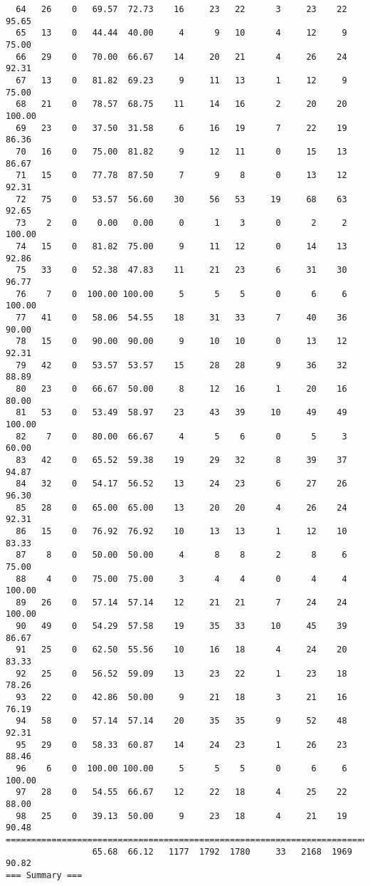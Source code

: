 \begin{verbatim}
  64   26    0   69.57  72.73    16     23   22      3     23    22    95.65
  65   13    0   44.44  40.00     4      9   10      4     12     9    75.00
  66   29    0   70.00  66.67    14     20   21      4     26    24    92.31
  67   13    0   81.82  69.23     9     11   13      1     12     9    75.00
  68   21    0   78.57  68.75    11     14   16      2     20    20   100.00
  69   23    0   37.50  31.58     6     16   19      7     22    19    86.36
  70   16    0   75.00  81.82     9     12   11      0     15    13    86.67
  71   15    0   77.78  87.50     7      9    8      0     13    12    92.31
  72   75    0   53.57  56.60    30     56   53     19     68    63    92.65
  73    2    0    0.00   0.00     0      1    3      0      2     2   100.00
  74   15    0   81.82  75.00     9     11   12      0     14    13    92.86
  75   33    0   52.38  47.83    11     21   23      6     31    30    96.77
  76    7    0  100.00 100.00     5      5    5      0      6     6   100.00
  77   41    0   58.06  54.55    18     31   33      7     40    36    90.00
  78   15    0   90.00  90.00     9     10   10      0     13    12    92.31
  79   42    0   53.57  53.57    15     28   28      9     36    32    88.89
  80   23    0   66.67  50.00     8     12   16      1     20    16    80.00
  81   53    0   53.49  58.97    23     43   39     10     49    49   100.00
  82    7    0   80.00  66.67     4      5    6      0      5     3    60.00
  83   42    0   65.52  59.38    19     29   32      8     39    37    94.87
  84   32    0   54.17  56.52    13     24   23      6     27    26    96.30
  85   28    0   65.00  65.00    13     20   20      4     26    24    92.31
  86   15    0   76.92  76.92    10     13   13      1     12    10    83.33
  87    8    0   50.00  50.00     4      8    8      2      8     6    75.00
  88    4    0   75.00  75.00     3      4    4      0      4     4   100.00
  89   26    0   57.14  57.14    12     21   21      7     24    24   100.00
  90   49    0   54.29  57.58    19     35   33     10     45    39    86.67
  91   25    0   62.50  55.56    10     16   18      4     24    20    83.33
  92   25    0   56.52  59.09    13     23   22      1     23    18    78.26
  93   22    0   42.86  50.00     9     21   18      3     21    16    76.19
  94   58    0   57.14  57.14    20     35   35      9     52    48    92.31
  95   29    0   58.33  60.87    14     24   23      1     26    23    88.46
  96    6    0  100.00 100.00     5      5    5      0      6     6   100.00
  97   28    0   54.55  66.67    12     22   18      4     25    22    88.00
  98   25    0   39.13  50.00     9     23   18      4     21    19    90.48
============================================================================
                 65.68  66.12   1177  1792  1780     33   2168  1969    90.82
=== Summary ===


\end{verbatim}
